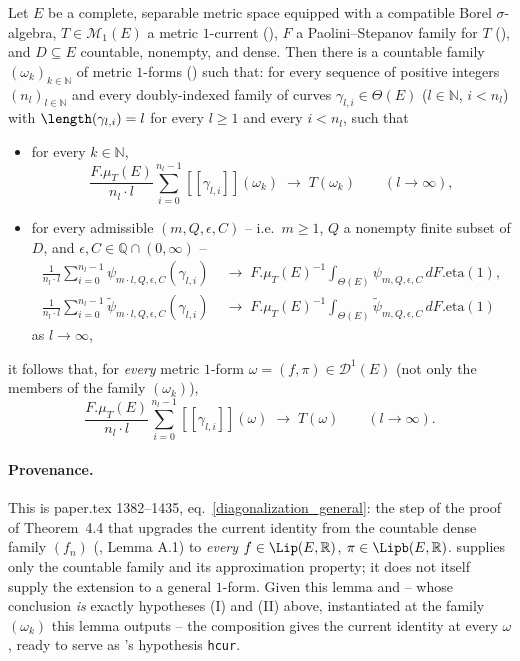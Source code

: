 \begin{lemma}\label{DiagonalizationGeneral}
  Let $E$ be a complete, separable metric space equipped with a compatible Borel
  $\sigma$-algebra, $T \in \mathcal{M}_1(E)$ a metric $1$-current (), $F$ a
  Paolini--Stepanov family for $T$ (), and $D \subseteq E$ countable, nonempty,
  and dense. Then there is a countable family $(\omega_k)_{k\in\mathbb{N}}$ of metric $1$-forms
  () such that: for every sequence of positive integers $(n_l)_{l\in\mathbb{N}}$ and
  every doubly-indexed family of curves $\gamma_{l,i} \in \Theta(E)$ ($l\in\mathbb{N}$,
  $i<n_l$) with $\length(\gamma_{l,i}) = l$ for every $l\ge1$ and every $i<n_l$, such that
  \begin{itemize}
    \item[(I)] for every $k\in\mathbb{N}$,
      \[
        \frac{F.\mu_T(E)}{n_l\cdot l}\sum_{i=0}^{n_l-1}[[\gamma_{l,i}]](\omega_k)
        \;\longrightarrow\; T(\omega_k)
        \qquad (l\to\infty)
        ,
      \]
    \item[(II)] for every admissible $(m,Q,\epsilon,C)$ -- i.e.\ $m\ge1$, $Q$ a nonempty finite
      subset of $D$, and $\epsilon,C\in\mathbb{Q}\cap(0,\infty)$ --
      \begin{align*}
        \frac{1}{n_l\cdot l}\sum_{i=0}^{n_l-1}\psi_{m\cdot l,Q,\epsilon,C}(\gamma_{l,i})
        &\;\longrightarrow\; F.\mu_T(E)^{-1}\int_{\Theta(E)}\psi_{m,Q,\epsilon,C}\,dF.\mathrm{eta}(1)
        ,\\
        \frac{1}{n_l\cdot l}\sum_{i=0}^{n_l-1}\tilde\psi_{m\cdot l,Q,\epsilon,C}(\gamma_{l,i})
        &\;\longrightarrow\; F.\mu_T(E)^{-1}\int_{\Theta(E)}\tilde\psi_{m,Q,\epsilon,C}\,dF.\mathrm{eta}(1)
      \end{align*}
      as $l\to\infty$,
  \end{itemize}
  it follows that, for \emph{every} metric $1$-form $\omega = (f,\pi) \in \mathcal{D}^1(E)$ (not
  only the members of the family $(\omega_k)$),
  \[
    \frac{F.\mu_T(E)}{n_l\cdot l}\sum_{i=0}^{n_l-1}[[\gamma_{l,i}]](\omega)
    \;\longrightarrow\; T(\omega)
    \qquad(l\to\infty)
    .
  \]

  \paragraph{Provenance.} This is paper.tex 1382--1435, eq.~\eqref{diagonalization_general}: the
  step of the proof of Theorem~4.4 that upgrades the current identity from the countable dense
  family $(f_n)$ (, Lemma A.1) to \emph{every} $f\in\Lip(E,\mathbb{R})$,
  $\pi\in\Lipb(E,\mathbb{R})$.  supplies only the countable family and
  its approximation property; it does not itself supply the extension to a general $1$-form. Given
  this lemma and  -- whose conclusion \emph{is} exactly hypotheses (I)
  and (II) above, instantiated at the family $(\omega_k)$ this lemma outputs -- the composition
  gives the current identity at every $\omega$, ready to serve as 's hypothesis
  \texttt{hcur}.


\end{lemma}
